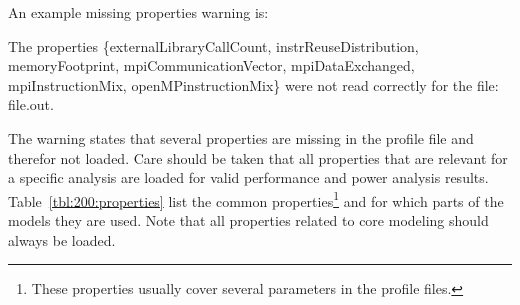 An example missing properties warning is:
\begin{mma}
	 The properties \linebreak \{externalLibraryCallCount, instrReuseDistribution, memoryFootprint, mpiCommunicationVector, mpiDataExchanged, mpiInstructionMix, openMPinstructionMix\} were not read correctly for the file: file.out. \\
\end{mma}
The warning states that several properties are missing in the profile file and therefor not loaded. Care should be taken that all properties that are relevant for a specific analysis are loaded for valid performance and power analysis results. Table~\ref{tbl:200:properties} list the common properties\footnote{These properties usually cover several parameters in the profile files.} and for which parts of the models they are used. Note that all properties related to core modeling should always be loaded.

